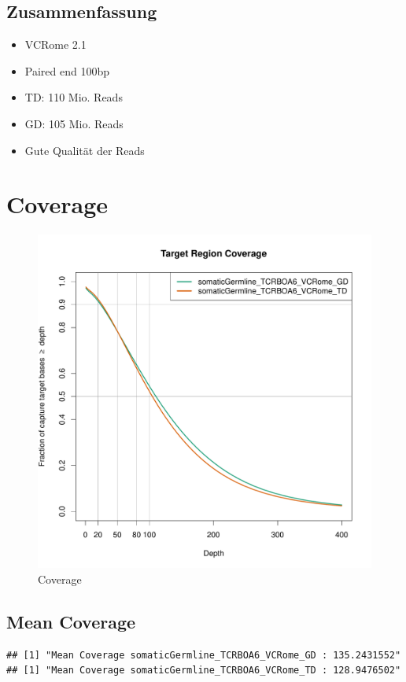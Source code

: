\documentclass[woside,a4paper,12pt]{article}\usepackage[]{graphicx}\usepackage[]{color}
\makeatletter
\newenvironment{kframe}{%
 \def\at@end@of@kframe{}%
 \ifinner\ifhmode%
  \def\at@end@of@kframe{\end{minipage}}%
  \begin{minipage}{\columnwidth}%
 \fi\fi%
 \def\FrameCommand##1{\hskip\@totalleftmargin \hskip-\fboxsep
 \colorbox{shadecolor}{##1}\hskip-\fboxsep
     \hskip-\linewidth \hskip-\@totalleftmargin \hskip\columnwidth}%
 \MakeFramed {\advance\hsize-\width
   \@totalleftmargin\z@ \linewidth\hsize
   \@setminipage}}%
 {\par\unskip\endMakeFramed%
 \at@end@of@kframe}
\newenvironment{knitrout}{}{} %
\makeatother
\begin{document}
\subsection{Zusammenfassung}

\begin{itemize}
\item VCRome 2.1
\item Paired end 100bp
\item TD: 110 Mio. Reads
\item GD: 105 Mio. Reads
\item Gute Qualität der Reads
\end{itemize}

\section{Coverage}

\begin{figure}[H]
\centering
\includegraphics[width=\textwidth]{somaticGermline_TCRBOA6_VCRome_coverage_2019-01-12.pdf}
\caption{Coverage}
\label{fig:5}
\end{figure}

\subsection{Mean Coverage}
\begin{knitrout}
\color{fgcolor}\begin{kframe}
\begin{verbatim}
## [1] "Mean Coverage somaticGermline_TCRBOA6_VCRome_GD : 135.2431552"
## [1] "Mean Coverage somaticGermline_TCRBOA6_VCRome_TD : 128.9476502"
\end{verbatim}
\end{kframe}
\end{knitrout}
\end{document}
